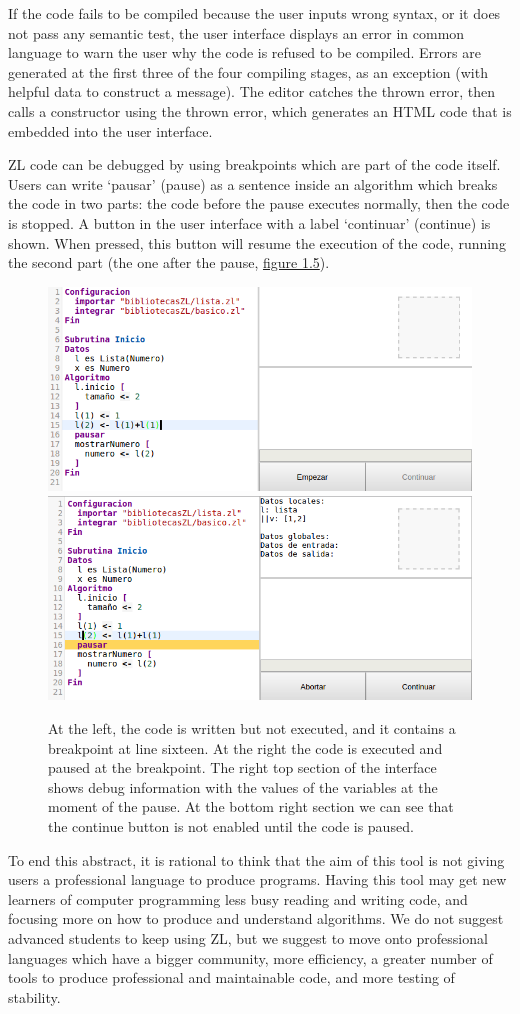 \documentclass{report}
\begin{document}
	If the code fails to be compiled because the user inputs wrong syntax, or it does not pass any semantic test, the user interface displays an error in common language to warn the user why the code is refused to be compiled. Errors are generated at the first three of the four compiling stages, as an exception (with helpful data to construct a message). The editor catches the thrown error, then calls a constructor using the thrown error, which generates an HTML code that is embedded into the user interface. 
	
	ZL code can be debugged by using breakpoints which are part of the code itself. Users can write `pausar' (pause) as a sentence inside an algorithm  which breaks the code in two parts: the code before the pause executes normally, then the code is stopped. A button in the user interface with a label `continuar' (continue) is shown. When pressed, this button will resume the execution of the code, running the second part (the one after the pause, \hyperref[fig:pausa]{figure 1.5}).  
	
\begin{figure}
\centering
\includegraphics[width=0.48\linewidth]{pausa1}
\includegraphics[width=0.48\linewidth]{pausa2}
\caption[Breakpoint: pause example.]{At the left, the code is written but not executed, and it contains a breakpoint at line sixteen. At the right the code is executed and paused at the breakpoint. The right top section of the interface shows debug information with the values of the variables at the moment of the pause. At the bottom right section we can see that the continue button is not enabled until the code is paused.}
\label{fig:pausa}
\end{figure}

	To end this abstract, it is rational to think that the aim of this tool is not giving users a professional language to produce programs. Having this tool may get new learners of computer programming less busy reading and writing code, and focusing more on how to produce and understand algorithms. We do not suggest advanced students to keep using ZL, but we suggest to move onto professional languages which have a bigger community, more efficiency, a greater number of tools to produce professional and maintainable code, and more testing of stability. 
\end{document}
